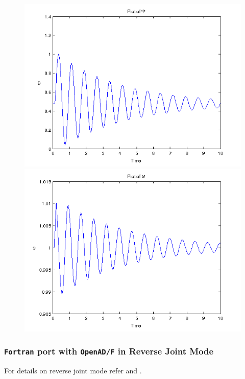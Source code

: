\clearpage
\begin{figure}[h]
\centering
\includegraphics[width=1.2\linewidth]{../Code/miniApps/power_grid/phi_fortran_da_oad_rs.png}
\label{fig:phi_fortran_da_oad_rs}
\includegraphics[width=1.2\linewidth]{../Code/miniApps/power_grid/omega_fortran_da_oad_rs.png}
\label{fig:omega_fortran_da_oad_rs}
\end{figure}
\clearpage
\subsubsection{\texttt{Fortran} port with \texttt{OpenAD/F} in Reverse Joint Mode}
For details on reverse joint mode refer \cite{Griewank_2008} and \cite{Utke_2014}.\\

